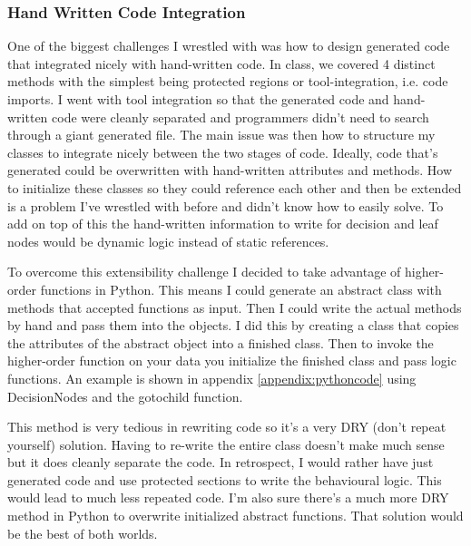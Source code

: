 \documentclass[letterpaper,12pt]{article}  %
\begin{document}
\subsubsection{Hand Written Code Integration}
One of the biggest challenges I wrestled with was how to design generated code that integrated nicely with hand-written code. In class, we covered 4 distinct methods with the simplest being protected regions or tool-integration, i.e. code imports. I went with tool integration so that the generated code and hand-written code were cleanly separated and programmers didn’t need to search through a giant generated file. The main issue was then how to structure my classes to integrate nicely between the two stages of code. Ideally, code that’s generated could be overwritten with hand-written attributes and methods. How to initialize these classes so they could reference each other and then be extended is a problem I’ve wrestled with before and didn’t know how to easily solve. To add on top of this the hand-written information to write for decision and leaf nodes would be dynamic logic instead of static references.

To overcome this extensibility challenge I decided to take advantage of higher-order functions in Python. This means I could generate an abstract class with methods that accepted functions as input. Then I could write the actual methods by hand and pass them into the objects. I did this by creating a class that copies the attributes of the abstract object into a finished class. Then to invoke the higher-order function on your data you initialize the finished class and pass logic functions.
An example is shown in appendix \ref{appendix:pythoncode} using DecisionNodes and the gotochild function.


This method is very tedious in rewriting code so it's a very DRY (don't repeat yourself) solution\cite{noauthor_dont_2021}. Having to re-write the entire class doesn't make much sense but it does cleanly separate the code. In retrospect, I would rather have just generated code and use protected sections to write the behavioural logic. This would lead to much less repeated code. I'm also sure there's a much more DRY method in Python to overwrite initialized abstract functions. That solution would be the best of both worlds.



\end{document}
